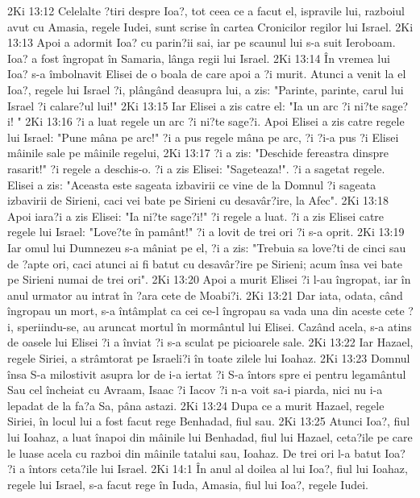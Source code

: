 2Ki 13:12  Celelalte ?tiri despre Ioa?, tot ceea ce a facut el, ispravile lui, razboiul avut cu Amasia, regele Iudei, sunt scrise în cartea Cronicilor regilor lui Israel.
2Ki 13:13  Apoi a adormit Ioa? cu parin?ii sai, iar pe scaunul lui s-a suit Ieroboam. Ioa? a fost îngropat în Samaria, lânga regii lui Israel.
2Ki 13:14  În vremea lui Ioa? s-a îmbolnavit Elisei de o boala de care apoi a ?i murit. Atunci a venit la el Ioa?, regele lui Israel ?i, plângând deasupra lui, a zis: "Parinte, parinte, carul lui Israel ?i calare?ul lui!"
2Ki 13:15  Iar Elisei a zis catre el: "Ia un arc ?i ni?te sage?i! "
2Ki 13:16  ?i a luat regele un arc ?i ni?te sage?i. Apoi Elisei a zis catre regele lui Israel: "Pune mâna pe arc!" ?i a pus regele mâna pe arc, ?i ?i-a pus ?i Elisei mâinile sale pe mâinile regelui,
2Ki 13:17  ?i a zis: "Deschide fereastra dinspre rasarit!" ?i regele a deschis-o. ?i a zis Elisei: "Sageteaza!". ?i a sagetat regele. Elisei a zis: "Aceasta este sageata izbavirii ce vine de la Domnul ?i sageata izbavirii de Sirieni, caci vei bate pe Sirieni cu desavâr?ire, la Afec".
2Ki 13:18  Apoi iara?i a zis Elisei: "Ia ni?te sage?i!" ?i regele a luat. ?i a zis Elisei catre regele lui Israel: "Love?te în pamânt!" ?i a lovit de trei ori ?i s-a oprit.
2Ki 13:19  Iar omul lui Dumnezeu s-a mâniat pe el, ?i a zis: "Trebuia sa love?ti de cinci sau de ?apte ori, caci atunci ai fi batut cu desavâr?ire pe Sirieni; acum însa vei bate pe Sirieni numai de trei ori".
2Ki 13:20  Apoi a murit Elisei ?i l-au îngropat, iar în anul urmator au intrat în ?ara cete de Moabi?i.
2Ki 13:21  Dar iata, odata, când îngropau un mort, s-a întâmplat ca cei ce-l îngropau sa vada una din aceste cete ?i, speriindu-se, au aruncat mortul în mormântul lui Elisei. Cazând acela, s-a atins de oasele lui Elisei ?i a înviat ?i s-a sculat pe picioarele sale.
2Ki 13:22  Iar Hazael, regele Siriei, a strâmtorat pe Israeli?i în toate zilele lui Ioahaz.
2Ki 13:23  Domnul însa S-a milostivit asupra lor de i-a iertat ?i S-a întors spre ei pentru legamântul Sau cel încheiat cu Avraam, Isaac ?i Iacov ?i n-a voit sa-i piarda, nici nu i-a lepadat de la fa?a Sa, pâna astazi.
2Ki 13:24  Dupa ce a murit Hazael, regele Siriei, în locul lui a fost facut rege Benhadad, fiul sau.
2Ki 13:25  Atunci Ioa?, fiul lui Ioahaz, a luat înapoi din mâinile lui Benhadad, fiul lui Hazael, ceta?ile pe care le luase acela cu razboi din mâinile tatalui sau, Ioahaz. De trei ori l-a batut Ioa? ?i a întors ceta?ile lui Israel.
2Ki 14:1  În anul al doilea al lui Ioa?, fiul lui Ioahaz, regele lui Israel, s-a facut rege în Iuda, Amasia, fiul lui Ioa?, regele Iudei.
